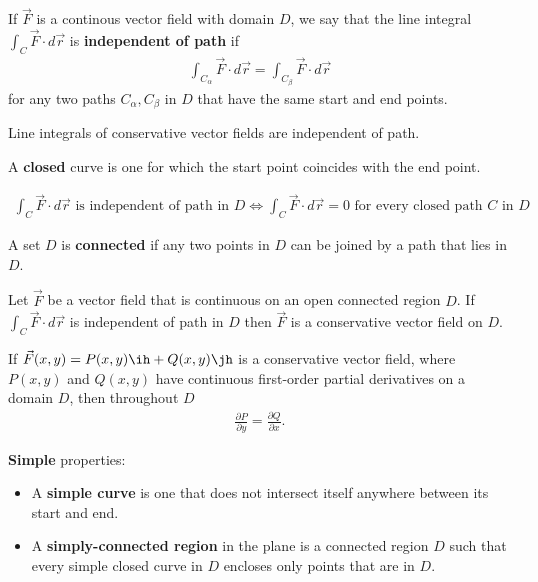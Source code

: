 \documentclass{article}
\begin{document}
\begin{definition}
    If $\vec F$ is a continous vector field with domain $D$, we say that the
    line integral $\int_C\vec F\cdot d\vec r$ is
    \textbf{independent of path} if
    \begin{align*}
        \int_{C_\alpha} \vec F\cdot d\vec r = \int_{C_\beta}\vec F\cdot d\vec r
    \end{align*}
    for any two paths $C_\alpha, C_\beta$ in $D$ that have the same start and
    end points.
\end{definition}
\begin{theorem}
    Line integrals of conservative vector fields are independent of path.
\end{theorem}
\begin{definition}
    A \textbf{closed} curve is one for which the start point coincides with the end point.
\end{definition}
\begin{theorem}
    \begin{align*}
        \int_C \vec F\cdot d\vec r \text{ is independent of path in $D$}
        \Leftrightarrow
        \int_C \vec F\cdot d\vec r = 0 \text{ for every closed path $C$ in $D$}
    \end{align*}
\end{theorem}
\begin{definition}
    A set $D$ is \textbf{connected} if any two points in $D$ can be joined by a
    path that lies in $D$.
\end{definition}
\begin{theorem}
    Let $\vec F$ be a vector field that is continuous on an open connected
    region $D$. If $\int_C\vec F\cdot d\vec r$ is independent of path in $D$
    then $\vec F$ is a conservative vector field on $D$.
\end{theorem}
\begin{theorem}
    If $\vec F(x,y) = P(x,y)\ih + Q(x,y)\jh$ is a conservative vector field,
    where $P(x,y)$ and $Q(x,y)$ have continuous first-order partial derivatives
    on a domain $D$, then throughout $D$
    \begin{align*}
        \frac{\partial P}{\partial y}=\frac{\partial Q}{\partial x}.
    \end{align*}
\end{theorem}
\begin{definition}
    \textbf{Simple} properties:
    \begin{itemize}
        \item A \textbf{simple curve} is one that does not intersect itself anywhere
              between its start and end.
        \item A \textbf{simply-connected region} in the plane is a connected region $D$
              such that every simple closed curve in $D$ encloses only points that
              are in $D$.
    \end{itemize}
\end{definition}
\end{document}
